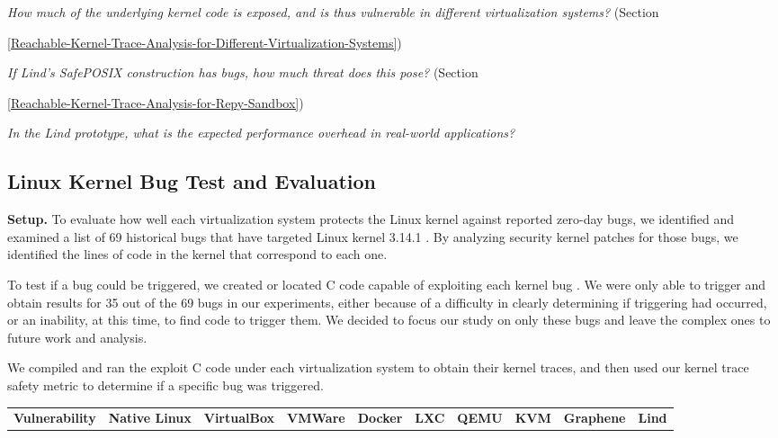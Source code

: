 \textit{How much of the underlying kernel code is exposed, and is thus
vulnerable in different virtualization systems?}
(Section~{{\ref{Reachable-Kernel-Trace-Analysis-for-Different-Virtualization-Systems}})

\textit{If Lind's SafePOSIX construction has bugs, how much threat does this pose?}
(Section~{{\ref{Reachable-Kernel-Trace-Analysis-for-Repy-Sandbox}})

\textit{In the Lind prototype, what is the expected performance overhead in
real-world applications?}


\subsection{Linux Kernel Bug Test and Evaluation}
\label{Linux-Kernel-Bug-Test-and-Evaluation}


\noindent
\textbf{Setup.}
To evaluate how well each virtualization system protects the Linux kernel
against reported zero-day bugs, 
we identified and examined a list of 69 historical bugs that have
targeted Linux kernel 3.14.1 \cite{CVE-Datasource}.
By analyzing security kernel patches for those bugs,
we identified the lines of code in the kernel that correspond to each one.

To test if a bug could be triggered, we created or located C
code capable of exploiting each kernel bug \cite{Exploit-Database}.
We were only able to trigger and obtain results for 35 out of the 69 bugs in our experiments,
either because of a difficulty in clearly determining if triggering had occurred, or an inability,
at this time, to find code to trigger them. We decided to focus our study on
only these bugs and leave the complex ones to future work and analysis.

We compiled and ran the exploit C code under each virtualization system to
obtain their kernel traces, and then used our kernel trace safety metric to
determine if a specific bug was triggered.

\begin{table*}[!ht]
\scriptsize
\centering

\begin{tabular}{|p{1.7cm}|l|l|p{1cm}|p{1cm}|p{.8cm}|p{1cm}|p{.8cm}|p{1cm}|p{.8cm}|}\hline

\multirow{2}{1.7cm}{\bf Vulnerability}    &  \multirow{2}{.7cm}{\bf Native Linux}  &  \multirow{2}{*}{\bf VirtualBox}
&  \multirow{2}{.7cm}{\bf VMWare}
 & \multirow{2}{1cm}{\bf Docker} & \multirow{2}{1cm}{\bf LXC} &
\multirow{2}{1cm}{\bf QEMU} & \multirow{2}{1cm}{\bf KVM} &
\multirow{2}{1cm}{\bf Graphene} & \multirow{2}{1cm}{\bf Lind} \\
& & & & & & & & & \\
\hline


\end{tabular}
\end{table*}}}
